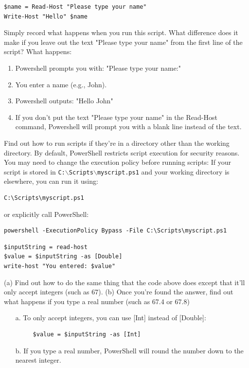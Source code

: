 \documentclass[a4paper]{article}
\begin{document}
\begin{verbatim}
$name = Read-Host "Please type your name"
Write-Host "Hello" $name
\end{verbatim}
\textcolor{green!50!black}{
    Simply record what happens when you run this script. What difference
    does it make if you leave out the text "Please type your name" from the first line of
    the script?
} 
\noindent
What happens: 
\begin{enumerate}
    \item Powershell prompts you with: "Please type your name:"
    \item You enter a name (e.g., John).
    \item Powershell outputs: "Hello John"
    \item If you don't put the text "Please type your name" in the Read-Host command, Powershell will prompt you with a blank line instead of the text.
\end{enumerate}
\textcolor{green!50!black}{
    Find out how to run scripts if they’re in a directory other than the
    working directory.
}
By default, PowerShell restricts script execution for security reasons. You may need to change the execution policy before running scripts:
If your script is stored in \texttt{C:$\backslash$Scripts$\backslash$myscript.ps1} and your working directory is elsewhere, you can run it using:
\begin{verbatim}
C:\Scripts\myscript.ps1
\end{verbatim}
or explicitly call PowerShell:
\begin{verbatim}
powershell -ExecutionPolicy Bypass -File C:\Scripts\myscript.ps1
\end{verbatim}
\begin{verbatim}
$inputString = read-host
$value = $inputString -as [Double]
write-host "You entered: $value"
\end{verbatim}
\textcolor{green!50!black}{
    (a) Find out how to do the same thing that the code above does except
    that it’ll only accept integers (such as 67). (b) Once you’re found the answer, find out
    what happens if you type a real number (such as 67.4 or 67.8)}
\begin{itemize}
    \item[a.] To only accept integers, you can use [Int] instead of [Double]:
     \begin{verbatim}
     $value = $inputString -as [Int]
    \end{verbatim}
    \item[b.] If you type a real number, PowerShell will round the number down to the nearest integer.
\end{itemize}
\end{document}
